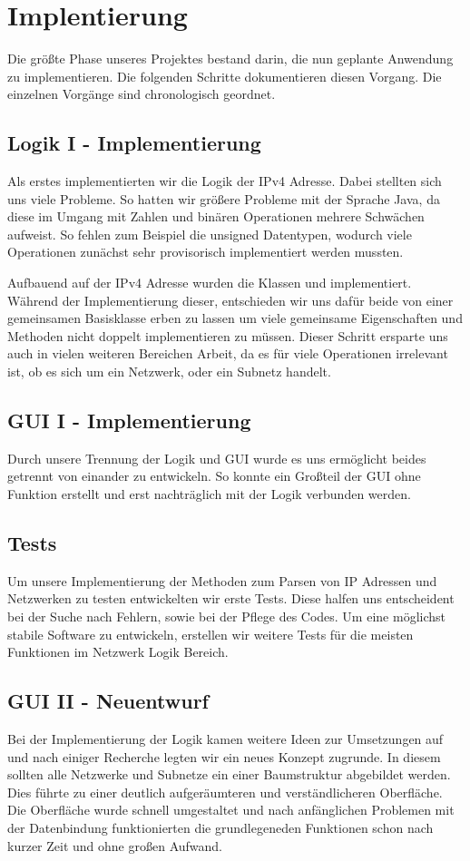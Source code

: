 \section{Implentierung}
Die größte Phase unseres Projektes bestand darin, die nun geplante Anwendung zu implementieren.
Die folgenden Schritte dokumentieren diesen Vorgang. Die einzelnen Vorgänge sind chronologisch geordnet.

\subsection{Logik I - Implementierung}
Als erstes implementierten wir die Logik der IPv4 Adresse. Dabei stellten sich uns viele
Probleme. So hatten wir größere Probleme mit der Sprache Java, da diese im Umgang mit
Zahlen und binären Operationen mehrere Schwächen aufweist. So fehlen zum Beispiel die
unsigned Datentypen, wodurch viele Operationen zunächst sehr provisorisch implementiert
werden mussten.

Aufbauend auf der IPv4 Adresse wurden die Klassen  und  implementiert.
Während der Implementierung dieser, entschieden wir uns dafür beide von einer gemeinsamen Basisklasse
 erben zu lassen um viele gemeinsame Eigenschaften und Methoden nicht doppelt
implementieren zu müssen.
Dieser Schritt ersparte uns auch in vielen weiteren Bereichen Arbeit, da es für viele Operationen
irrelevant ist, ob es sich um ein Netzwerk, oder ein Subnetz handelt.

\subsection{GUI I - Implementierung}
Durch unsere Trennung der Logik und GUI wurde es uns ermöglicht beides getrennt von einander
zu entwickeln. So konnte ein Großteil der GUI ohne Funktion erstellt und erst nachträglich
mit der Logik verbunden werden.

\subsection{Tests}
Um unsere Implementierung der Methoden zum Parsen von IP Adressen und Netzwerken zu testen entwickelten
wir erste Tests. Diese halfen uns entscheident bei der Suche nach Fehlern, sowie bei der Pflege des Codes.
Um eine möglichst stabile Software zu entwickeln, erstellen wir weitere Tests für die meisten Funktionen
im Netzwerk Logik Bereich. 

\subsection{GUI II - Neuentwurf}
Bei der Implementierung der Logik kamen weitere Ideen zur Umsetzungen auf und nach einiger Recherche
legten wir ein neues Konzept zugrunde. In diesem sollten alle Netzwerke und Subnetze ein einer
Baumstruktur abgebildet werden. Dies führte zu einer deutlich aufgeräumteren und
verständlicheren Oberfläche.
Die Oberfläche wurde schnell umgestaltet und nach anfänglichen Problemen mit der Datenbindung
funktionierten die grundlegeneden Funktionen schon nach kurzer Zeit und ohne großen Aufwand.

